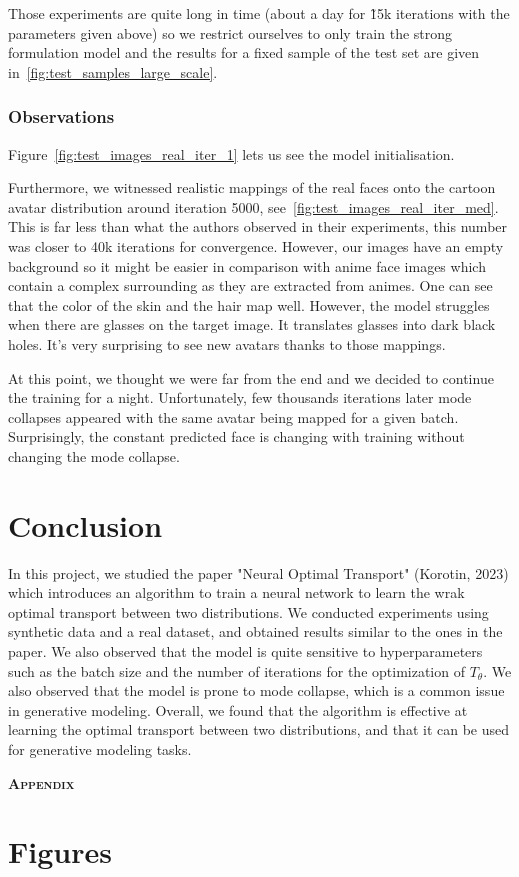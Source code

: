 \documentclass[11pt]{article}
\begin{document}
Those experiments are quite long in time (about a day for \~15k iterations with the parameters given above) so we restrict ourselves to only train the strong formulation model and the results for a fixed sample of the test set are given in~\ref{fig:test_samples_large_scale}.

\subsubsection{Observations}

Figure~\ref{fig:test_images_real_iter_1} lets us see the model initialisation.

Furthermore, we witnessed realistic mappings of the real faces onto the cartoon avatar distribution around iteration 5000, see~\ref{fig:test_images_real_iter_med}. This is far less than what the authors observed in their experiments, this number was closer to 40k iterations for convergence. However, our images have an empty background so it might be easier in comparison with anime face images which contain a complex surrounding as they are extracted from animes. One can see that the color of the skin and the hair map well. However, the model struggles when there are glasses on the target image. It translates glasses into dark black holes. It's very surprising to see new avatars thanks to those mappings.

At this point, we thought we were far from the end and we decided to continue the training for a night. Unfortunately, few thousands iterations later mode collapses appeared with the same avatar being mapped for a given batch. Surprisingly, the constant predicted face is changing with training without changing the mode collapse.

\section{Conclusion}

In this project, we studied the paper "Neural Optimal Transport" (Korotin, 2023) \cite{korotin-2022} which introduces an algorithm to train a neural network to learn the wrak optimal transport between two distributions. We conducted experiments using synthetic data and a real dataset, and obtained results similar to the ones in the paper. We also observed that the model is quite sensitive to hyperparameters such as the batch size and the number of iterations for the optimization of $T_\theta$. We also observed that the model is prone to mode collapse, which is a common issue in generative modeling. Overall, we found that the algorithm is effective at learning the optimal transport between two distributions, and that it can be used for generative modeling tasks.

\newpage


\newpage
\appendix

\begin{center}
    {\Large \bfseries \scshape Appendix} \\
\end{center}

\section{Figures}
\end{document}
